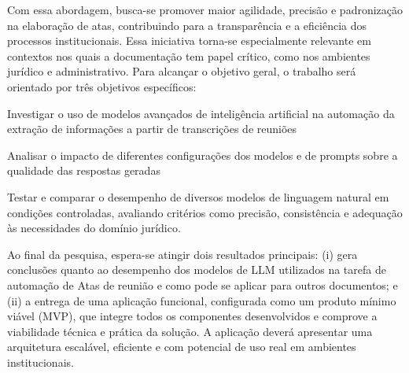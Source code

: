 Com essa abordagem, busca-se promover maior agilidade, precisão e padronização na elaboração de atas, contribuindo para a transparência e a eficiência dos processos institucionais. Essa iniciativa torna-se especialmente relevante em contextos nos quais a documentação tem papel crítico, como nos ambientes jurídico e administrativo. Para alcançar o objetivo geral, o trabalho será orientado por três objetivos específicos: 

	\begin{alineas}
		\item  Investigar o uso de modelos avançados de inteligência artificial na automação da extração de informações a partir de transcrições de reuniões
		\item Analisar o impacto de diferentes configurações dos modelos e de prompts sobre a qualidade das respostas geradas
		\item  Testar e comparar o desempenho de diversos modelos de linguagem natural em condições controladas, avaliando critérios como precisão, consistência e adequação às necessidades do domínio jurídico.
	\end{alineas}

Ao final da pesquisa, espera-se atingir dois resultados principais: (i) gera conclusões quanto ao desempenho dos modelos de LLM utilizados na tarefa de automação de Atas de reunião e como pode se aplicar para outros documentos; e (ii) a entrega de uma aplicação funcional, configurada como um produto mínimo viável (MVP), que integre todos os componentes desenvolvidos e comprove a viabilidade técnica e prática da solução. A aplicação deverá apresentar uma arquitetura escalável, eficiente e com potencial de uso real em ambientes institucionais.
